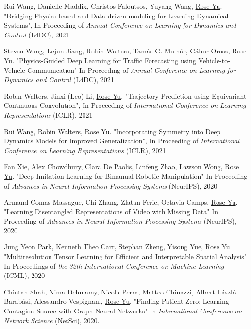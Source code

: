 \documentclass[margin,line]{res}
\begin{document}
\begin{resume}
\begin{enumerate}[label={[C\arabic*]}]
\item  Rui Wang, Danielle Maddix, Christos Faloutsos, Yuyang Wang, \underline{Rose Yu}. "Bridging Physics-based and Data-driven modeling for Learning Dynamical Systems", In Proceeding of 
\textit{Annual Conference on Learning for Dynamics and Control}
 (L4DC), 2021 


\item Steven Wong, Lejun Jiang, Robin Walters, Tam{\'{a}}s G. Moln{\'{a}}r, G{\'{a}}bor Orosz,  \underline{Rose Yu}. "Physics-Guided Deep Learning for Traffic Forecasting using Vehicle-to-Vehicle Communication" In Proceeding of  
\textit{Annual Conference on Learning for Dynamics and Control}
 (L4DC), 2021 


\item  Robin Walters, Jinxi (Leo) Li, \underline{Rose Yu}. "Trajectory Prediction using Equivariant Continuous Convolution", In Proceeding of \textit{International Conference on Learning Representations} (ICLR), 2021

\item  Rui Wang, Robin Walters, \underline{Rose Yu}.  "Incorporating Symmetry into Deep Dynamics Models for Improved Generalization", In Proceeding of  \textit{International Conference on Learning Representations} (ICLR), 2021

\item Fan Xie,  Alex  Chowdhury, Clara De Paolis, Linfeng Zhao, Lawson Wong,  \underline{Rose Yu}.
"Deep Imitation Learning for Bimanual  Robotic Manipulation"
  In Proceeding of \textit{Advances in Neural Information Processing Systems} (NeurIPS), 2020
  
\item Armand Comas Massague, Chi Zhang, Zlatan Feric, Octavia Camps,  \underline{Rose Yu}.
"Learning Disentangled Representations of Video with Missing Data"
  In  Proceeding of \textit{Advances in Neural Information Processing Systems} (NeurIPS), 2020
 
      
\item Jung Yeon Park, Kenneth Theo Carr, Stephan Zheng, Yisong Yue, \underline{Rose Yu}
"Multiresolution Tensor Learning for Efficient and Interpretable Spatial Analysis"
 In Proceedings  of  \textit{the 32th International Conference on Machine Learning} (ICML), 2020
  
\item Chintan Shah, Nima Dehmamy, Nicola Perra, Matteo Chinazzi, Albert-László Barabási, Alessandro Vespignani, \underline{Rose Yu}.
"Finding Patient Zero: Learning Contagion Source with Graph Neural Networks"
 In \textit{International Conference on Network Science} (NetSci),  2020. 
     

\end{enumerate}
\end{resume}
\end{document}
